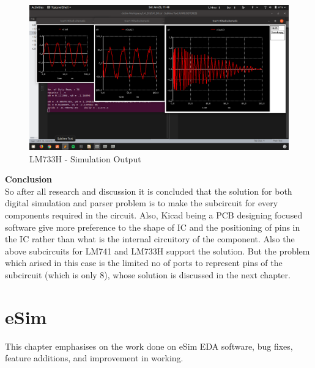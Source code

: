 \documentclass[12pt,a4paper]{report}
\begin{document}
\vspace{5mm}
\begin{figure}[h]
	\centering
	\includegraphics[width=\textwidth]{lm733h_sim}
	\caption{LM733H - Simulation Output}
\end{figure}
\vspace{5mm}
\textbf{\Large Conclusion}
\vspace{5mm}
\\
So after all research and discussion it is concluded that the solution for both digital simulation and parser problem is to make the subcircuit for every components required in the circuit. Also, Kicad being a PCB designing focused software give more preference to the shape of IC and the positioning of pins in the IC rather than what is the internal circuitory of the component. Also the above subcircuits for LM741 and LM733H support the solution. But the problem which arised in this case is the limited no of ports to represent pins of the subcircuit (which is only 8), whose solution is discussed in the next chapter.



\chapter{\textbf{eSim}}
This chapter emphasises on the work done on eSim EDA software, bug fixes, feature additions, and improvement in working.
\end{document}
